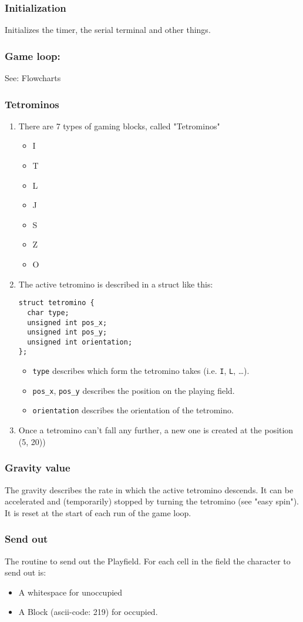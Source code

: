 \documentclass[11pt]{article}
\begin{document}
\subsubsection{Initialization}
\label{sec:org22ca2b4}
Initializes the timer, the serial terminal and other things.
\subsubsection{Game loop:}
\label{sec:org61ca272}
See: Flowcharts
\subsubsection{Tetrominos}
\label{sec:orgd2235ad}
\begin{enumerate}
\item There are 7 types of gaming blocks, called "Tetrominos"
\label{sec:orga7f5164}
\begin{itemize}
\item I
\item T
\item L
\item J
\item S
\item Z
\item O
\end{itemize}
\item The active tetromino is described in a struct like this:
\label{sec:orgd90b3c3}
\begin{verbatim}
struct tetromino {
  char type;
  unsigned int pos_x;
  unsigned int pos_y;
  unsigned int orientation;
};
\end{verbatim}
\begin{itemize}
\item \texttt{type} describes which form the tetromino takes (i.e. \texttt{I}, \texttt{L}, \ldots{}).
\item \texttt{pos\_x}, \texttt{pos\_y} describes the position on the playing field.
\item \texttt{orientation} describes the orientation of the tetromino.
\end{itemize}
\item Once a tetromino can't fall any further, a new one is created at the position (5, 20))
\label{sec:org3b99201}
\end{enumerate}
\subsubsection{Gravity value}
\label{sec:orga84211d}
The gravity describes the rate in which the active tetromino descends. It can be accelerated and (temporarily) stopped by turning the tetromino (see "easy spin"). It is reset at the start of each run of the game loop.
\subsubsection{Send out}
\label{sec:orge66cbcc}
The routine to send out the Playfield. For each cell in the field the character to send out is:
\begin{itemize}
\item A whitespace for unoccupied
\item A Block (ascii-code: 219) for occupied.
\end{itemize}
\end{document}
